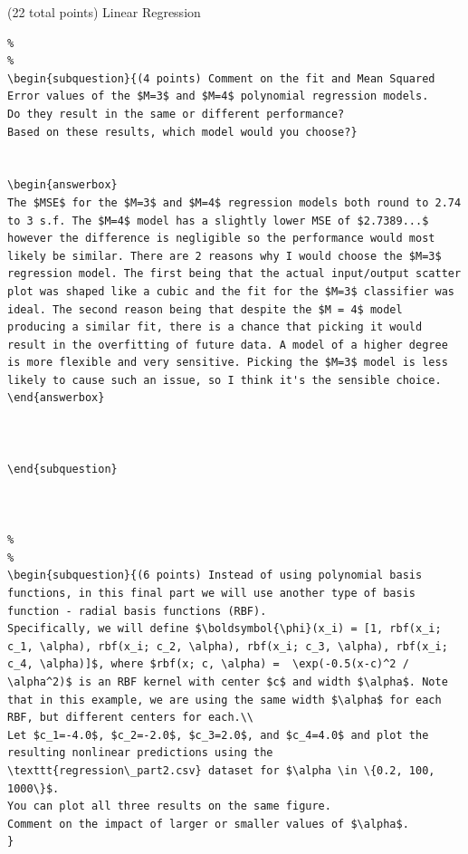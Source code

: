 \documentclass[12pt]{article}
\begin{document}
\begin{question}{(22 total points) Linear Regression}
\begin{subquestion}
\begin{answerbox}{20em}
\begin {verbatim}
%
%
\begin{subquestion}{(4 points) Comment on the fit and Mean Squared Error values of the $M=3$ and $M=4$ polynomial regression models. 
Do they result in the same or different performance? 
Based on these results, which model would you choose?}


\begin{answerbox}{15em}
The $MSE$ for the $M=3$ and $M=4$ regression models both round to 2.74 to 3 s.f. The $M=4$ model has a slightly lower MSE of $2.7389...$ however the difference is negligible so the performance would most likely be similar. There are 2 reasons why I would choose the $M=3$ regression model. The first being that the actual input/output scatter plot was shaped like a cubic and the fit for the $M=3$ classifier was ideal. The second reason being that despite the $M = 4$ model producing a similar fit, there is a chance that picking it would result in the overfitting of future data. A model of a higher degree is more flexible and very sensitive. Picking the $M=3$ model is less likely to cause such an issue, so I think it's the sensible choice.
\end{answerbox}



\end{subquestion}



%
%
\begin{subquestion}{(6 points) Instead of using polynomial basis functions, in this final part we will use another type of basis function - radial basis functions (RBF). 
Specifically, we will define $\boldsymbol{\phi}(x_i) = [1, rbf(x_i; c_1, \alpha), rbf(x_i; c_2, \alpha), rbf(x_i; c_3, \alpha), rbf(x_i; c_4, \alpha)]$, where $rbf(x; c, \alpha) =  \exp(-0.5(x-c)^2 / \alpha^2)$ is an RBF kernel with center $c$ and width $\alpha$. Note that in this example, we are using the same width $\alpha$ for each RBF, but different centers for each.\\ 
Let $c_1=-4.0$, $c_2=-2.0$, $c_3=2.0$, and $c_4=4.0$ and plot the resulting nonlinear predictions using the \texttt{regression\_part2.csv} dataset for $\alpha \in \{0.2, 100, 1000\}$. 
You can plot all three results on the same figure.
Comment on the impact of larger or smaller values of $\alpha$.
}



\end{verbatim}
\end{answerbox}
\end{subquestion}
\end{question}
\end{document}
